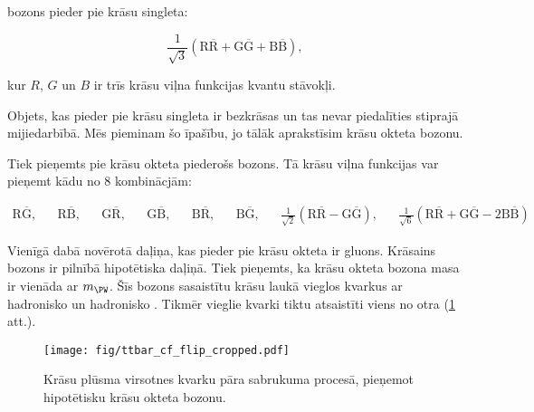 \PW bozons pieder pie krāsu singleta:

\begin{equation}
\frac{1}{\sqrt{3}}\left(\text{R}\overline{\text{R}}+\text{G}\overline{\text{G}}+\text{B}\overline{\text{B}}\right),
\end{equation}

kur $R$, $G$ un $B$ ir trīs krāsu viļna funkcijas kvantu stāvokļi.

Objets, kas pieder pie krāsu singleta ir bezkrāsas un tas nevar piedalīties stiprajā mijiedarbībā. Mēs pieminam šo īpašību, jo tālāk aprakstīsim krāsu okteta \PW bozonu.

Tiek pieņemts pie krāsu okteta piederošs \PW bozons. Tā krāsu viļna funkcijas var pieņemt kādu no 8 kombinācjām:

\begin{align}
\text{R}\overline{\text{G}}, && \text{R}\overline{\text{B}}, && \text{G}\overline{\text{R}}, && \text{G}\overline{\text{B}}, && \text{B}\overline{\text{R}}, && \text{B}\overline{\text{G}}, && \frac{1}{\sqrt{2}}\left(\text{R}\overline{\text{R}}-\text{G}\overline{\text{G}}\right), && \frac{1}{\sqrt{6}}\left(\text{R}\overline{\text{R}}+\text{G}\overline{\text{G}}-2\text{B}\overline{\text{B}}\right)
\end{align}

Vienīgā dabā novērotā daļiņa, kas pieder pie krāsu okteta ir gluons. Krāsains \PW bozons ir pilnībā hipotētiska daļiņā. Tiek pieņemts, ka krāsu okteta \PW bozona masa ir vienāda ar $m_{\PW}$. Šīs bozons sasaistītu krāsu laukā vieglos kvarkus ar hadronisko \cPqb un hadronisko \cPqt. Tikmēr vieglie kvarki tiktu atsaistīti viens no otra (\ref{fig:ttbar_cf_octet} att.).
  
  \begin{figure}[h!]
  \centering
  \texttt{[image: fig/ttbar\_cf\_flip\_cropped.pdf]}
  \caption{Krāsu plūsma virsotnes kvarku pāra sabrukuma procesā, pieņemot hipotētisku krāsu okteta \PW bozonu.}
  \label{fig:ttbar_cf_octet}
\end{figure}

